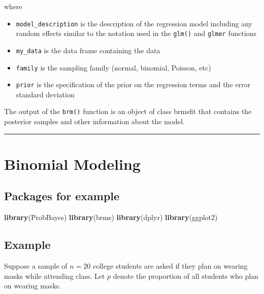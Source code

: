 \documentclass[
]{book}
\newenvironment{Shaded}{\begin{snugshade}}{\end{snugshade}}
\newcommand{\KeywordTok}[1]{\textcolor[rgb]{0.13,0.29,0.53}{\textbf{#1}}}
\newcommand{\NormalTok}[1]{#1}
\providecommand{\tightlist}{%
  \setlength{\itemsep}{0pt}\setlength{\parskip}{0pt}}
\begin{document}
where

\begin{itemize}
\tightlist
\item
  \texttt{model\_description} is the description of the regression model including any random effects similar to the notation used in the \texttt{glm()} and \texttt{glmer} functions
\item
  \texttt{my\_data} is the data frame containing the data
\item
  \texttt{family} is the sampling family (normal, binomial, Poisson, etc)
\item
  \texttt{prior} is the specification of the prior on the regression terms and the error standard deviation
\end{itemize}

The output of the \texttt{brm()} function is an object of class brmsfit that contains the posterior samples and other information about the model.

\begin{center}\rule{0.5\linewidth}{0.5pt}\end{center}

\hypertarget{binomial-modeling}{%
\chapter{Binomial Modeling}\label{binomial-modeling}}

\hypertarget{packages-for-example}{%
\section{Packages for example}\label{packages-for-example}}

\begin{Shaded}
\begin{Highlighting}[]
\KeywordTok{library}\NormalTok{(ProbBayes)}
\KeywordTok{library}\NormalTok{(brms)}
\KeywordTok{library}\NormalTok{(dplyr)}
\KeywordTok{library}\NormalTok{(ggplot2)}
\end{Highlighting}
\end{Shaded}

\hypertarget{example}{%
\section{Example}\label{example}}

Suppose a sample of \(n = 20\) college students are asked if they plan on wearing masks while attending class. Let \(p\) denote the proportion of all students who plan on wearing masks.
\end{document}
